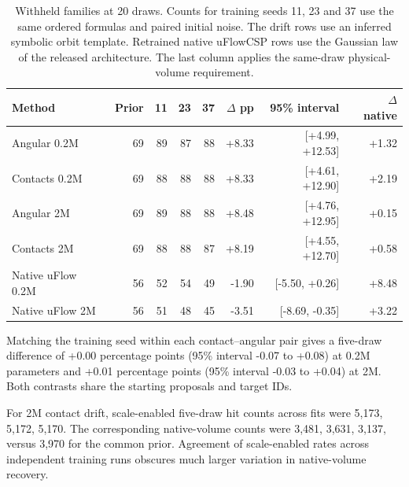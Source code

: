 \begin{table}[!htbp]\centering\small\setlength{\tabcolsep}{3.6pt}
\caption{Withheld families at 20 draws. Counts for training seeds 11, 23 and 37 use the same ordered formulas and paired initial noise. The drift rows use an inferred symbolic orbit template. Retrained native uFlowCSP rows use the Gaussian law of the released architecture. The last column applies the same-draw physical-volume requirement.}
\begin{tabular}{lrrrrrrr}\hline
Method & Prior & 11 & 23 & 37 & $\Delta$ pp & 95\% interval & $\Delta$ native\\\hline
Angular 0.2M & 69 & 89 & 87 & 88 & +8.33 & [+4.99, +12.53] & +1.32\\
Contacts 0.2M & 69 & 88 & 88 & 88 & +8.33 & [+4.61, +12.90] & +2.19\\
Angular 2M & 69 & 89 & 88 & 88 & +8.48 & [+4.76, +12.95] & +0.15\\
Contacts 2M & 69 & 88 & 88 & 87 & +8.19 & [+4.55, +12.70] & +0.58\\
Native uFlow 0.2M & 56 & 52 & 54 & 49 & -1.90 & [-5.50, +0.26] & +8.48\\
Native uFlow 2M & 56 & 51 & 48 & 45 & -3.51 & [-8.69, -0.35] & +3.22\\
\hline\end{tabular}\end{table}

Matching the training seed within each contact--angular pair gives a five-draw difference of +0.00 percentage points (95\% interval -0.07 to +0.08) at 0.2M parameters and +0.01 percentage points (95\% interval -0.03 to +0.04) at 2M. Both contrasts share the starting proposals and target IDs.

For 2M contact drift, scale-enabled five-draw hit counts across fits were 5,173, 5,172, 5,170. The corresponding native-volume counts were 3,481, 3,631, 3,137, versus 3,970 for the common prior. Agreement of scale-enabled rates across independent training runs obscures much larger variation in native-volume recovery.

